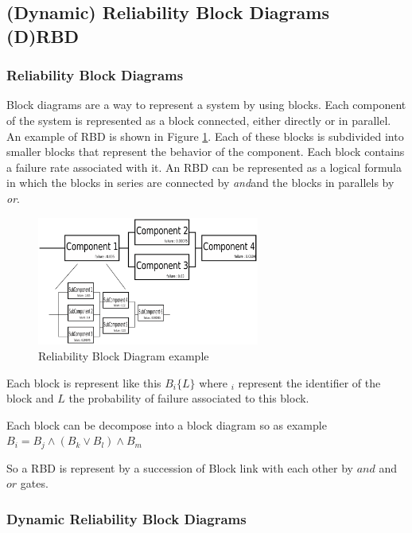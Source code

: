 \subsection {(Dynamic) Reliability Block Diagrams (D)RBD}

\subsubsection{Reliability Block Diagrams}

Block diagrams are a way to represent a system by using blocks. Each
component of the system is represented as a block connected, either
directly or in parallel. An example of RBD is shown in Figure
\ref{RDB}. \newline
Each of these blocks is subdivided into smaller blocks that represent
the behavior of the component. Each block contains a failure rate
associated with it. \newline
An RBD can be represented as a logical formula in which the blocks in
series are connected by \emph{and}and the blocks in parallels by \emph{or}.

\begin{figure}[h]
    \centering
	\includegraphics[width=0.65\textwidth]{schema/RDB.pdf}
    \caption{Reliability Block Diagram example}
    \label{RDB}
\end{figure}

Each block is represent like this $B_i\{L\}$ where $_i$ represent the
identifier of the block and $L$ the probability of failure associated
to this block.

Each block can be decompose into a block diagram so as example $B_i =
B_{j} \wedge (B_{k} \vee B_{l}) \wedge B_{m}$

So a RBD is represent by a succession of Block link with each other by
$and$ and $or$ gates.


\subsubsection{Dynamic Reliability Block Diagrams}

